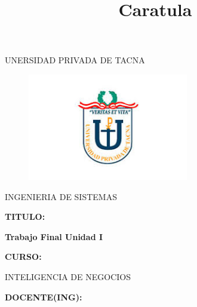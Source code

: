 \documentclass[12pt,letterpaper]{article}
\begin{document}
%


\title{Caratula}

\begin{titlepage}
\begin{center}
\large{UNERSIDAD PRIVADA DE TACNA}\\
\vspace*{-0.025in}
\begin{figure}[htb]
\begin{center}
\includegraphics[width=7cm]{./Imagenes/logo}
\end{center}
\end{figure}
\vspace*{0.15in}
INGENIERIA DE SISTEMAS  \\

\vspace*{0.3in}
\begin{large}
\textbf{TITULO:} \\
\end{large}

\vspace*{0.1in}
\begin{Large}
\textbf{Trabajo Final Unidad I} \\

\end{Large}

\vspace*{0.3in}
\begin{Large}
\textbf{CURSO:} \\
\end{Large}

\vspace*{0.1in}
\begin{large}
INTELIGENCIA DE NEGOCIOS\\
\end{large}

\vspace*{0.3in}
\begin{Large}
\textbf{DOCENTE(ING):} \\
\end{Large}


\end{center}
\end{titlepage}
\end{document}
